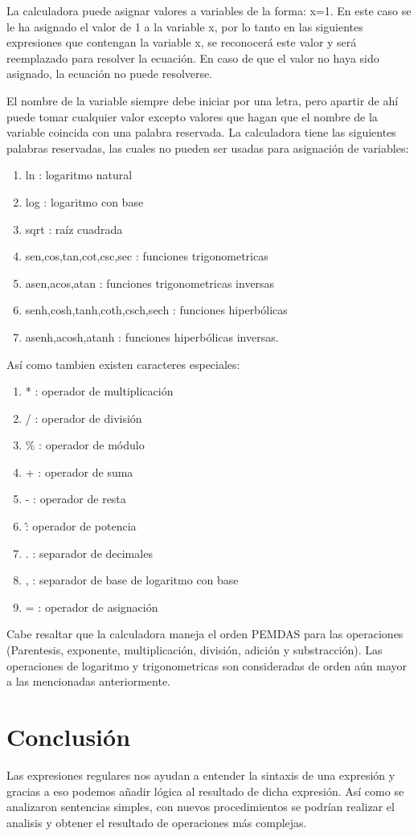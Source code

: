 \documentclass[10pt]{report}
\begin{document}
La calculadora puede asignar valores a variables de la forma: x=1. En este caso se le ha asignado el valor de 1 a la variable x, por lo tanto en las siguientes expresiones que contengan la variable x, se reconocerá este valor y será reemplazado para resolver la ecuación. En caso de que el valor no haya sido asignado, la ecuación no puede resolverse.

El nombre de la variable siempre debe iniciar por una letra, pero apartir de ahí puede tomar cualquier valor excepto valores que hagan que el nombre de la variable coincida con una palabra reservada. La calculadora tiene las siguientes palabras reservadas, las cuales no pueden ser usadas para asignación de variables:
\begin{enumerate}
    \item ln : logaritmo natural
    \item log : logaritmo con base
    \item sqrt : raíz cuadrada
    \item sen,cos,tan,cot,csc,sec : funciones trigonometricas
    \item asen,acos,atan : funciones trigonometricas inversas
    \item senh,cosh,tanh,coth,csch,sech : funciones hiperbólicas
    \item asenh,acosh,atanh : funciones hiperbólicas inversas.
\end{enumerate}
Así como tambien existen caracteres especiales:
\begin{enumerate}
    \item * : operador de multiplicación
    \item / : operador de división
    \item \% : operador de módulo
    \item + : operador de suma
    \item - : operador de resta
    \item \^ : operador de potencia
    \item . : separador de decimales
    \item , : separador de base de logaritmo con base
    \item = : operador de asignación
\end{enumerate}
Cabe resaltar que la calculadora maneja el orden PEMDAS para las operaciones (Parentesis, exponente, multiplicación, división, adición y substracción). Las operaciones de logaritmo y trigonometricas son consideradas de orden aún mayor a las mencionadas anteriormente.

\section*{Conclusión}
Las expresiones regulares nos ayudan a entender la sintaxis de una expresión y gracias a eso podemos añadir lógica al resultado de dicha expresión. Así como se analizaron sentencias simples, con nuevos procedimientos se podrían realizar el analisis y obtener el resultado de operaciones más complejas. 
\end{document}
